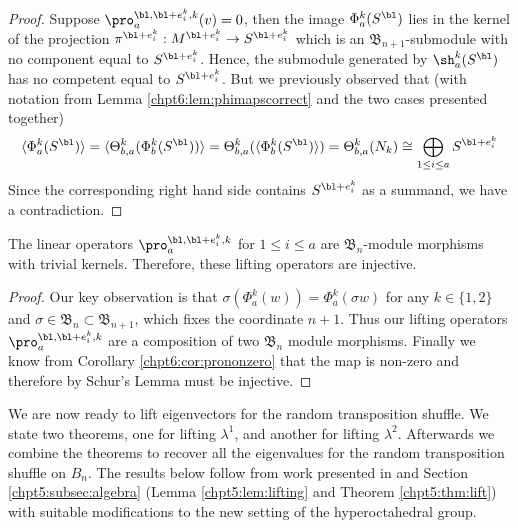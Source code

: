 \documentclass[11pt]{report}
\begin{document}
\begin{proof}
	Suppose 
	$\pro_{a}^{\bl,\bl+e_{i}^{k},k}(v) =0$, 
	then the image $\Phi_{a}^{k}(S^{\bl})$ lies in the kernel of 
	the projection $\pi^{\bl+ e_{i}^{k}}: M^{\bl 
		+e_{i}^{k}} \to S^{\bl + e_{i}^{k}}$ which is an 
	$\mathfrak{B}_{n+1}$-submodule with no component equal to 
	$S^{\bl+e_{i}^{k}}$. Hence, the submodule generated by $\sh_{a}^{k}(S^{\bl})$ has no competent equal to $S^{\bl+e_{i}^{k}}$. But we previously observed that (with 
	notation from Lemma \ref{chpt6:lem:phimapscorrect} and the two cases presented 
	together)
	\begin{eqnarray}
	\langle \Phi_{a}^{k}(S^{\bl}) \rangle =\langle 
	\Theta_{b,a}^{k} (\Phi_{b}^{k}(S^{\bl})) \rangle 
	= \Theta_{b,a}^{k} (\langle\Phi_{b}^{k}(S^{\bl})\rangle ) 
	= \Theta_{b,a}^{k}(N_{k}) \cong \bigoplus_{1 \leq i \leq a} S^{\bl+ e_{i}^{k}}
	\end{eqnarray}	
	Since the corresponding right hand side contains $S^{\bl+e_{i}^{k}}$ as a summand, we have a contradiction.
\end{proof}

\begin{lemma}
	\label{chpt6:lem:pro2inject}
	The linear operators 
	$\pro_{a}^{\bl,\bl+e^{k}_{i},k}$ for $1 \leq i \leq a$ are 
	$\mathfrak{B}_{n}$-module morphisms with trivial kernels. Therefore, these lifting operators are injective.
\end{lemma}
\begin{proof}
	Our key observation  is that $\sigma (\Phi_{a}^{k}(w)) = 
	\Phi_{a}^{k}(\sigma w)$ for any $k\in \{1,2\}$ and $\sigma \in 
	\mathfrak{B}_{n} \subset \mathfrak{B}_{n+1}$, which fixes the coordinate $n+1$. Thus 
	our lifting operators $\pro_{a}^{\bl,\bl+e^{k}_{i},k}$ are a composition of two $\mathfrak{B}_{n}$ 
	module morphisms. Finally we know from Corollary \ref{chpt6:cor:prononzero} that 
	the map is non-zero and therefore by Schur's Lemma must be injective.
\end{proof}



We are now ready to lift eigenvectors for the random transposition shuffle. We state two theorems, one for lifting $\lambda^{1}$, and another for lifting $\lambda^{2}$.
Afterwards we combine the theorems to recover all the eigenvalues for the random transposition shuffle on $B_{n}$. The results below follow from work presented in \cite{dieker2018spectral} and Section \ref{chpt5:subsec:algebra} (Lemma \ref{chpt5:lem:lifting} and Theorem \ref{chpt5:thm:lift}) with suitable modifications to the new setting of the hyperoctahedral group.
\end{document}
